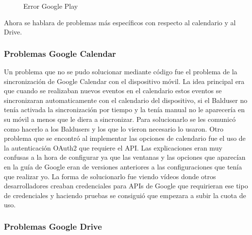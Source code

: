 \begin{figure}[H] 
  \begin{center} 
    \caption{Error Google Play} 
    \label{fig:ErrorGoogle} 
  \end{center} 
\end{figure}

Ahora se hablara de problemas más específicos con respecto al calendario y al Drive.

\subsubsection{Problemas Google Calendar}
\label{subsubsecc:Problemas Google Calendar}

Un problema que no se pudo solucionar mediante código fue el problema de la sincronización de Google Calendar con el dispositivo móvil. La idea principal era que cuando se realizaban nuevos eventos en el calendario estos eventos se sincronizaran automaticamente con el calendario del dispositivo, si el Balduser no tenía activada la sincronización por tiempo y la tenía manual no le aparecería en su móvil a menos que le diera a sincronizar.
Para solucionarlo se les comunicó como hacerlo a los Baldusers y los que lo vieron necesario lo usaron.
Otro problema que se encontró al implementar las opciones de calendario fue el uso de la autenticación OAuth2 que requiere el API.
Las explicaciones eran muy confusas a la hora de configurar ya que las ventanas y las opciones que aparecían en la guía de Google eran de versiones anteriores a las configuraciones que tenía que realizar yo.
La forma de solucionarlo fue viendo vídeos donde otros desarrolladores creaban credenciales para APIs de Google que requirieran ese tipo de credenciales y haciendo pruebas se consiguió que empezara a subir la cuota de uso.


\subsubsection{Problemas Google Drive}
\label{subsubsecc:Problemas Google Drive}


